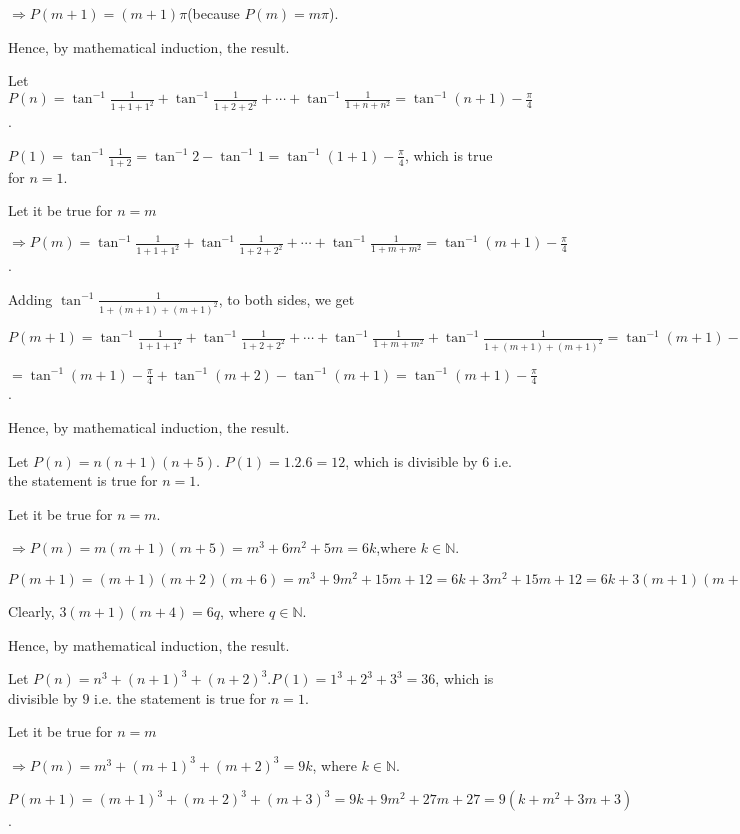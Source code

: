   $\Rightarrow P(m + 1) = (m + 1)\pi$(because $P(m) = m\pi$).

  Hence, by mathematical induction, the result.
\item Let $P(n) = \tan^{-1}\frac{1}{1 + 1 + 1^2} + \tan^{-1}\frac{1}{1 + 2 + 2^2} + \cdots +
  \tan^{-1}\frac{1}{1 + n + n^2} = \tan^{-1}(n + 1) - \frac{\pi}{4}$.

  $P(1) = \tan^{-1}\frac{1}{1 + 2} = \tan^{-1}2 - \tan^{-1}1 = \tan^{-1}(1 + 1) - \frac{\pi}{4}$, which is
  true for $n = 1$.

  Let it be true for $n = m$

  $\Rightarrow P(m) = \tan^{-1}\frac{1}{1 + 1 + 1^2} + \tan^{-1}\frac{1}{1 + 2 + 2^2} + \cdots +
  \tan^{-1}\frac{1}{1 + m + m^2} = \tan^{-1}(m + 1) - \frac{\pi}{4}$.

  Adding $\tan^{-1}\frac{1}{1 + (m + 1) + (m + 1)^2}$, to both sides, we get

  $P(m + 1) = \tan^{-1}\frac{1}{1 + 1 + 1^2} + \tan^{-1}\frac{1}{1 + 2 + 2^2} + \cdots +
  \tan^{-1}\frac{1}{1 + m + m^2} + \tan^{-1}\frac{1}{1 + (m + 1) + (m + 1)^2}= \tan^{-1}(m + 1) -
  \frac{\pi}{4} + \tan^{-1}\frac{1}{1 + (m + 1) + (m + 1)^2}$

  $= \tan^{-1}(m + 1) -\frac{\pi}{4} + \tan^{-1}(m + 2) - \tan^{-1}(m + 1) = \tan^{-1}(m + 1) -
  \frac{\pi}{4}$.

  Hence, by mathematical induction, the result.
\item Let $P(n) = n(n + 1)(n + 5)$. $P(1) = 1.2.6 = 12$, which is divisible by $6$ i.e. the statement is
  true for $n =1$.

  Let it be true for $n = m$.

  $\Rightarrow P(m) = m(m + 1)(m + 5) = m^3 + 6m^2 + 5m = 6k$,where $k\in\mathbb{N}$.

  $P(m + 1) = (m + 1)(m + 2)(m + 6) = m^3 + 9m^2 + 15m + 12 = 6k + 3m^2 + 15m + 12 = 6k + 3(m + 1)(m + 4)$

  Clearly, $3(m + 1)(m + 4) = 6q$, where $q\in\mathbb{N}$.

  Hence, by mathematical induction, the result.
\item Let $P(n) = n^3 + (n + 1)^3 + (n + 2)^3. P(1) = 1^3 + 2^3 + 3^3 = 36$, which is divisible by $9$
  i.e. the statement is true for $n = 1$.

  Let it be true for $n = m$

  $\Rightarrow P(m) = m^3 + (m + 1)^3 + (m + 2)^3 = 9k$, where $k\in\mathbb{N}$.

  $P(m + 1) = (m + 1)^3 + (m + 2)^3 + (m + 3)^3 = 9k + 9m^2 + 27 m + 27 = 9(k + m^2 + 3m + 3)$.

